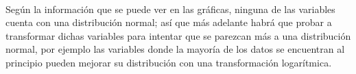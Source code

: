 \documentclass[11pt]{article}
\begin{document}
    
    
    \begin{center}
    \end{center}
    { \hspace*{\fill} \\}
    
    
    
    \begin{center}
    \end{center}
    { \hspace*{\fill} \\}
    
    
    
    \begin{center}
    \end{center}
    { \hspace*{\fill} \\}
    
    
    
    \begin{center}
    \end{center}
    { \hspace*{\fill} \\}
    
    
    
    \begin{center}
    \end{center}
    { \hspace*{\fill} \\}
    
    \begin{center}
    \end{center}
    { \hspace*{\fill} \\}
    
    Según la información que se puede ver en las gráficas, ninguna de las
variables cuenta con una distribución normal; así que más adelante habrá
que probar a transformar dichas variables para intentar que se parezcan
más a una distribución normal, por ejemplo las variables donde la
mayoría de los datos se encuentran al principio pueden mejorar su
distribución con una transformación logarítmica.
\end{document}
